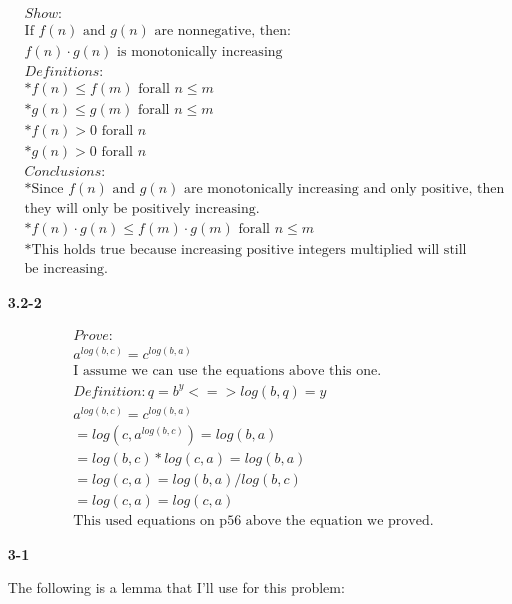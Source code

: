 \documentclass{article}
\begin{document}
\begin{enumerate}
	\begin{align*}
  & Show: \\
  & \text{If $f(n)$ and $g(n)$ are nonnegative, then:} \\
  & \text{$f(n) \cdot g(n)$ is monotonically increasing} \\
  & Definitions: \\
   & * f(n) \leq f(m) \text{  forall } n \leq m \\
   & * g(n) \leq g(m) \text{  forall } n \leq m \\
   & * f(n) > 0 \text{  forall } n \\
   & * g(n) > 0 \text{  forall } n \\
  & Conclusions: \\
	 & * \text{Since $f(n)$ and $g(n)$ are monotonically increasing and only positive, then} \\
		 & \text{they will only be positively increasing.} \\
   & * f(n) \cdot g(n) \leq f(m) \cdot g(m) \text{  forall } n \leq m \\
	 & * \text{This holds true because increasing positive integers multiplied will still} \\
		 & \text{be increasing.}
	\end{align*}

\item[\textbf{3.2-2}]

	\begin{align*}
	& Prove: \\
		& a^{log(b,c)} = c^{log(b,a)} \\
		& \text{I assume we can use the equations above this one.} \\
		& Definition: q = b^y <=> log(b,q) = y \\
			& a^{log(b,c)} = c^{log(b,a)} \\
			& = log(c,a^{log(b,c)}) = log(b,a) \\
			& = log(b,c) * log(c,a) = log(b,a) \\
			& = log(c,a) = log(b,a) / log(b,c) \\
			& = log(c,a) = log(c, a) \\
		& \text{This used equations on p56 above the equation we proved.}
	\end{align*}

\item[\textbf{3-1}]

The following is a lemma that I'll use for this problem:

\begin{enumerate}


\end{enumerate}
\end{enumerate}
\end{document}

